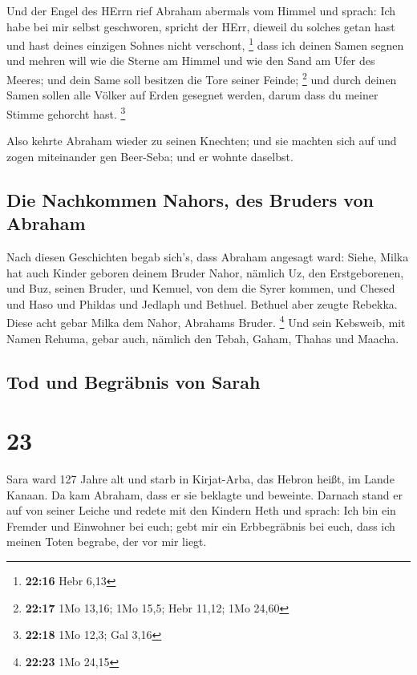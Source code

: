  Und der Engel des HErrn rief Abraham abermals vom Himmel
 und sprach: Ich habe bei mir selbst geschworen, spricht
der HErr, dieweil du solches getan hast und hast deines einzigen Sohnes
nicht verschont, \footnote{\textbf{22:16} Hebr 6,13} 
dass ich deinen Samen segnen und mehren will wie die Sterne am Himmel
und wie den Sand am Ufer des Meeres; und dein Same soll besitzen die
Tore seiner Feinde; \footnote{\textbf{22:17} 1Mo 13,16; 1Mo 15,5; Hebr
  11,12; 1Mo 24,60}  und durch deinen Samen sollen alle
Völker auf Erden gesegnet werden, darum dass du meiner Stimme gehorcht
hast. \footnote{\textbf{22:18} 1Mo 12,3; Gal 3,16}

 Also kehrte Abraham wieder zu seinen Knechten; und sie
machten sich auf und zogen miteinander gen Beer-Seba; und er wohnte
daselbst.

\hypertarget{die-nachkommen-nahors-des-bruders-von-abraham}{%
\subsection{Die Nachkommen Nahors, des Bruders von
Abraham}\label{die-nachkommen-nahors-des-bruders-von-abraham}}

 Nach diesen Geschichten begab sich's, dass Abraham
angesagt ward: Siehe, Milka hat auch Kinder geboren deinem Bruder Nahor,
 nämlich Uz, den Erstgeborenen, und Buz, seinen Bruder,
und Kemuel, von dem die Syrer kommen,  und Chesed und
Haso und Phildas und Jedlaph und Bethuel.  Bethuel aber
zeugte Rebekka. Diese acht gebar Milka dem Nahor, Abrahams Bruder.
\footnote{\textbf{22:23} 1Mo 24,15}  Und sein Kebsweib,
mit Namen Rehuma, gebar auch, nämlich den Tebah, Gaham, Thahas und
Maacha.

\hypertarget{tod-und-begruxe4bnis-von-sarah}{%
\subsection{Tod und Begräbnis von
Sarah}\label{tod-und-begruxe4bnis-von-sarah}}

\hypertarget{section-22}{%
\section{23}\label{section-22}}

 Sara ward 127 Jahre alt  und starb in
Kirjat-Arba, das Hebron heißt, im Lande Kanaan. Da kam Abraham, dass er
sie beklagte und beweinte.  Darnach stand er auf von
seiner Leiche und redete mit den Kindern Heth und sprach: 
Ich bin ein Fremder und Einwohner bei euch; gebt mir ein Erbbegräbnis
bei euch, dass ich meinen Toten begrabe, der vor mir liegt.

